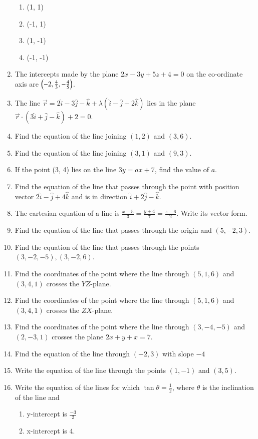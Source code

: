 \begin{enumerate}[label=\thesubsection.\arabic*, ref=\thesubsection.\theenumi]
\begin{enumerate}
\item (1, 1)
\item (-1, 1)
\item (1, -1)
\item (-1, -1)
\end{enumerate}
\item The intercepts made by the plane $2x-3y+5z+4=0$ on the co-ordinate axis are $\left(-2, \frac{4}{3}, -\frac{4}{5}\right)$.
\item The line $\overrightarrow{r}=2\hat{i}-3\hat{j}-\hat{k}+\lambda(\hat{i}-\hat{j}+2\hat{k})$ lies in the plane $\overrightarrow{r} \cdot (3\hat{i}+\hat{j}-\hat{k})+2=0$.
\item Find the equation of the line joining $(1, 2)$ and $(3, 6)$.
\item Find the equation of the line joining $(3, 1)$ and $(9, 3)$.
\item If the point (3,  4) lies on the line $3y=ax+7$,  find the value of $a$.
\item  Find the equation of the line that passes through the point with position vector $2\hat{i}-\hat{j}+4\hat{k}$ and is in direction $\hat{i}+2\hat{j}-\hat{k}$.
\item The cartesian equation of a line is $ \frac{x-5}{3}=\frac{y+4}{7}=\frac{z-6}{2}$. Write its vector form.
\item Find the equation of the line that passes through the origin and $(5, -2, 3)$.
\item Find the equation of the line that passes through the points $(3, -2, -5), (3, -2, 6)$.
\item Find the coordinates of the point where the line through $(5,1,6)$ and $(3,4,1)$ crosses the $YZ$-plane.
\item Find the coordinates of the point where the line through $(5,1,6)$ and $(3,4,1)$ crosses the $ZX$-plane.
\item Find the coordinates of the point where the line through $(3,-4,-5)$ and $(2,-3,1)$ crosses the plane $2x+y+x=7$.
\item Find the equation of the line through $(-2,3)$ with slope $-4$
\item Write the equation of the line through the points $(1,-1)$ and $(3,5)$.
\item Write the equation of the lines for which $\tan \theta=\frac{1}{2}$, where $\theta$ is the inclination of the line and
\begin{enumerate}
\item  y-intercept is $\frac{-3}{2}$ 
\item  x-intercept is $4$.

\end{enumerate}
\end{enumerate}
